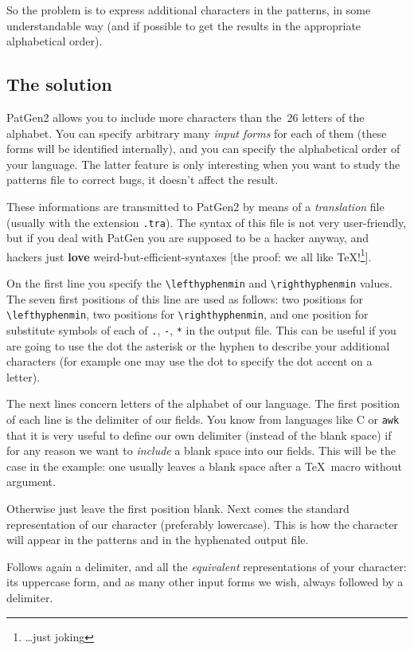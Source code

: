 So the problem is to express additional characters in the patterns, in some
understandable way (and if possible to get the results in the appropriate
alphabetical order).

\subsection{The solution}
PatGen2 allows you to include more characters than the~26 letters of
the alphabet.  You can specify arbitrary many {\em input forms} for
each of them (these forms will be identified internally), and you can
specify the alphabetical order of your language. The latter feature is
only interesting when you want to study the patterns file to correct
bugs, it doesn't affect the result.

These informations are transmitted to PatGen2 by means of a {\em
translation} file (usually with the extension \verb=.tra=). The syntax
of this file is not very user-friendly, but if you deal with PatGen
you are supposed to be a hacker anyway, and hackers just {\bf love}
weird-but-efficient-syntaxes [the proof: we all like
\TeX!\footnote{\ldots just joking}].

On the first line you specify the \verb=\lefthyphenmin= and
\verb=\righthyphenmin= values. The seven first positions of this line
are used as follows: two positions for \verb=\lefthyphenmin=, two
positions for \verb=\righthyphenmin=, and one position for substitute
symbols of each of \verb=.=, \verb=-=, \verb=*= in the output file.
This can be useful if you are going to use the dot the asterisk or the
hyphen to describe your additional characters (for example one may use
the dot to specify the dot accent on a letter).

The next lines concern letters of the alphabet of our language. The
first position of each line is the delimiter of our fields. You know
from languages like C or {\tt awk} that it is very useful to define
our own delimiter (instead of the blank space) if for any reason we
want to {\em include} a blank space into our fields. This will be the
case in the example: one usually leaves a blank space after a \TeX\
macro without argument.

Otherwise just leave the first position blank.  Next comes the
standard representation of our character (preferably lowercase). This
is how the character will appear in the patterns and in the hyphenated
output file.

Follows again a delimiter, and all the {\em equivalent}
representations of your character: its uppercase form, and as many
other input forms we wish, always followed by a delimiter.


